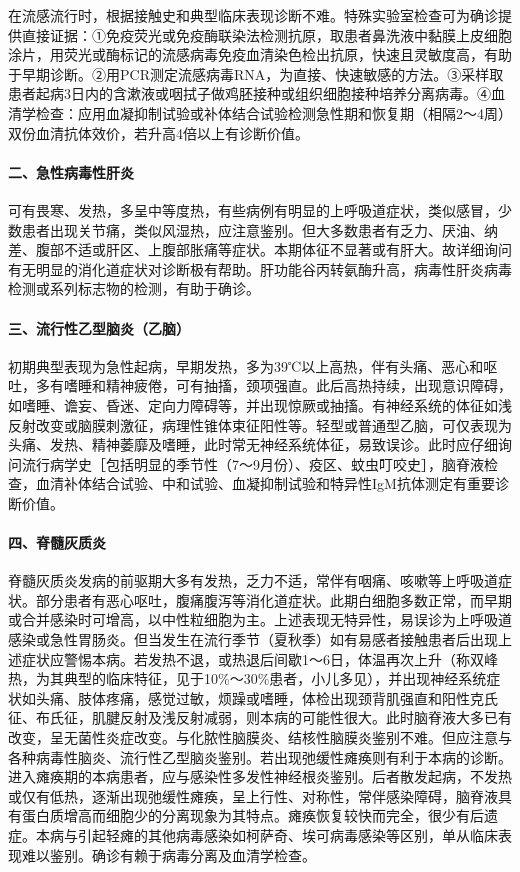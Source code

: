 在流感流行时，根据接触史和典型临床表现诊断不难。特殊实验室检查可为确诊提供直接证据：①免疫荧光或免疫酶联染法检测抗原，取患者鼻洗液中黏膜上皮细胞涂片，用荧光或酶标记的流感病毒免疫血清染色检出抗原，快速且灵敏度高，有助于早期诊断。②用PCR测定流感病毒RNA，为直接、快速敏感的方法。③采样取患者起病3日内的含漱液或咽拭子做鸡胚接种或组织细胞接种培养分离病毒。④血清学检查：应用血凝抑制试验或补体结合试验检测急性期和恢复期（相隔2～4周）双份血清抗体效价，若升高4倍以上有诊断价值。

\paragraph{二、急性病毒性肝炎}

可有畏寒、发热，多呈中等度热，有些病例有明显的上呼吸道症状，类似感冒，少数患者出现关节痛，类似风湿热，应注意鉴别。但大多数患者有乏力、厌油、纳差、腹部不适或肝区、上腹部胀痛等症状。本期体征不显著或有肝大。故详细询问有无明显的消化道症状对诊断极有帮助。肝功能谷丙转氨酶升高，病毒性肝炎病毒检测或系列标志物的检测，有助于确诊。

\paragraph{三、流行性乙型脑炎（乙脑）}

初期典型表现为急性起病，早期发热，多为39℃以上高热，伴有头痛、恶心和呕吐，多有嗜睡和精神疲倦，可有抽搐，颈项强直。此后高热持续，出现意识障碍，如嗜睡、谵妄、昏迷、定向力障碍等，并出现惊厥或抽搐。有神经系统的体征如浅反射改变或脑膜刺激征，病理性锥体束征阳性等。轻型或普通型乙脑，可仅表现为头痛、发热、精神萎靡及嗜睡，此时常无神经系统体征，易致误诊。此时应仔细询问流行病学史［包括明显的季节性（7～9月份）、疫区、蚊虫叮咬史］，脑脊液检查，血清补体结合试验、中和试验、血凝抑制试验和特异性IgM抗体测定有重要诊断价值。

\paragraph{四、脊髓灰质炎}

脊髓灰质炎发病的前驱期大多有发热，乏力不适，常伴有咽痛、咳嗽等上呼吸道症状。部分患者有恶心呕吐，腹痛腹泻等消化道症状。此期白细胞多数正常，而早期或合并感染时可增高，以中性粒细胞为主。上述表现无特异性，易误诊为上呼吸道感染或急性胃肠炎。但当发生在流行季节（夏秋季）如有易感者接触患者后出现上述症状应警惕本病。若发热不退，或热退后间歇1～6日，体温再次上升（称双峰热，为其典型的临床特征，见于10\%～30\%患者，小儿多见），并出现神经系统症状如头痛、肢体疼痛，感觉过敏，烦躁或嗜睡，体检出现颈背肌强直和阳性克氏征、布氏征，肌腱反射及浅反射减弱，则本病的可能性很大。此时脑脊液大多已有改变，呈无菌性炎症改变。与化脓性脑膜炎、结核性脑膜炎鉴别不难。但应注意与各种病毒性脑炎、流行性乙型脑炎鉴别。若出现弛缓性瘫痪则有利于本病的诊断。进入瘫痪期的本病患者，应与感染性多发性神经根炎鉴别。后者散发起病，不发热或仅有低热，逐渐出现弛缓性瘫痪，呈上行性、对称性，常伴感染障碍，脑脊液具有蛋白质增高而细胞少的分离现象为其特点。瘫痪恢复较快而完全，很少有后遗症。本病与引起轻瘫的其他病毒感染如柯萨奇、埃可病毒感染等区别，单从临床表现难以鉴别。确诊有赖于病毒分离及血清学检查。

